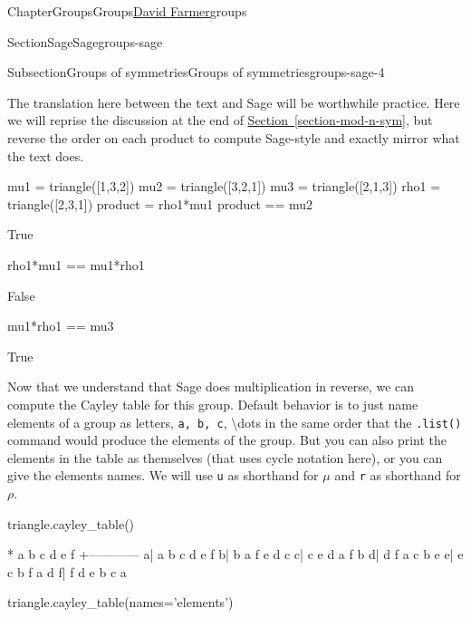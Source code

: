 \documentclass[oneside,10pt,]{book}
\newcommand{\xreffont}{\relax}
\newcommand{\mono}[1]{\texttt{#1}}
\numberwithin{equation}{section}
\begin{document}
\begin{chapterptx}{Chapter}{Groups}{}{Groups}{\hyperlink{dfarmer}{David Farmer}}{}{groups}
\begin{sectionptx}{Section}{Sage}{}{Sage}{}{}{groups-sage}
\begin{subsectionptx}{Subsection}{Groups of symmetries}{}{Groups of symmetries}{}{}{groups-sage-4}
\par
The translation here between the text and Sage will be worthwhile practice.  Here we will reprise the discussion at the end of \hyperref[section-mod-n-sym]{Section~{\xreffont\ref{section-mod-n-sym}}}, but reverse the order on each product to compute Sage-style and exactly mirror what the text does.%
\begin{sageinput}
mu1 = triangle([1,3,2])
mu2 = triangle([3,2,1])
mu3 = triangle([2,1,3])
rho1 = triangle([2,3,1])
product = rho1*mu1
product == mu2
\end{sageinput}
\begin{sageoutput}
True
\end{sageoutput}
\begin{sageinput}
\end{sageinput}
\begin{sageoutput}
[3, 2, 1]
\end{sageoutput}
\begin{sageinput}
rho1*mu1 == mu1*rho1
\end{sageinput}
\begin{sageoutput}
False
\end{sageoutput}
\begin{sageinput}
mu1*rho1 == mu3
\end{sageinput}
\begin{sageoutput}
True
\end{sageoutput}
Now that we understand that Sage does multiplication in reverse, we can compute the Cayley table for this group.  Default behavior is to just name elements of a group as letters, \mono{a, b, c}, \textbackslash{}dots\textbraceleft{}\textbraceright{} in the same order that the \mono{.list()} command would produce the elements of the group.  But you can also print the elements in the table as themselves (that uses cycle notation here), or you can give the elements names.  We will use \mono{u} as shorthand for \(\mu\) and \mono{r} as shorthand for \(\rho\).%
\begin{sageinput}
triangle.cayley_table()
\end{sageinput}
\begin{sageoutput}
*  a b c d e f
 +------------
a| a b c d e f
b| b a f e d c
c| c e d a f b
d| d f a c b e
e| e c b f a d
f| f d e b c a
\end{sageoutput}
\begin{sageinput}
triangle.cayley_table(names='elements')
\end{sageinput}
\begin{sageoutput}

\end{sageoutput}
\end{subsectionptx}
\end{sectionptx}
\end{chapterptx}
\end{document}
